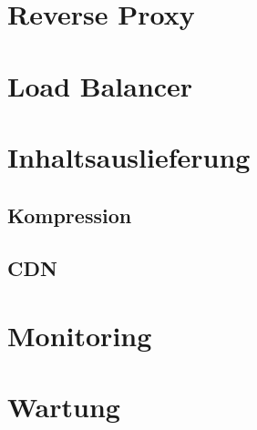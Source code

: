 \section{Reverse Proxy}
\label{sec:reverseproxy}

\section{Load Balancer}
\label{sec:loadbalancer}

\section{Inhaltsauslieferung}
\label{sec:inhaltsauslieferung}

\subsection{Kompression}
\label{subsec:kompression}

\subsection{CDN}
\label{subsec:cdn}

\section{Monitoring}
\label{sec:monitoring}

\section{Wartung}
\label{sec:wartung}
